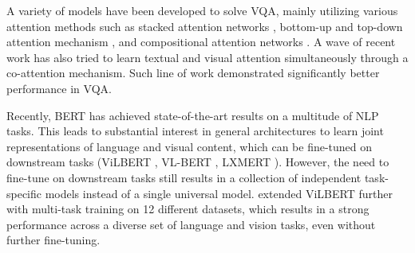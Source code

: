 \documentclass{article}
\begin{document}

A variety of models have been developed to solve VQA, mainly utilizing various attention methods such as stacked attention networks \citep{yang2016vqa}, bottom-up and top-down attention mechanism \citep{Anderson_2018_CVPR}, and compositional attention networks \citep{hudson2018mac}. A wave of recent work has also tried to learn textual and visual attention simultaneously through a co-attention mechanism. Such line of work \citep{yu2019mcan, Nguyen_2018_CVPR} demonstrated significantly better performance in VQA. 

Recently, BERT \citep{devlin-etal-2019-bert} has achieved state-of-the-art results on a multitude of NLP tasks. This leads to substantial interest in general architectures to learn joint representations of language and visual content, %
which can be fine-tuned on downstream tasks (ViLBERT \citep{lu2019vilbert}, VL-BERT \citep{Su2020VL-BERT}, LXMERT \citep{tan2019lxmert}). However, the need to fine-tune on downstream tasks still results in a collection of independent task-specific models instead of a single universal model. \citet{lu2020multitask} extended ViLBERT further with multi-task training on 12 different datasets, which results in a strong performance across a diverse set of language and vision tasks, even without further fine-tuning.
\end{document}

